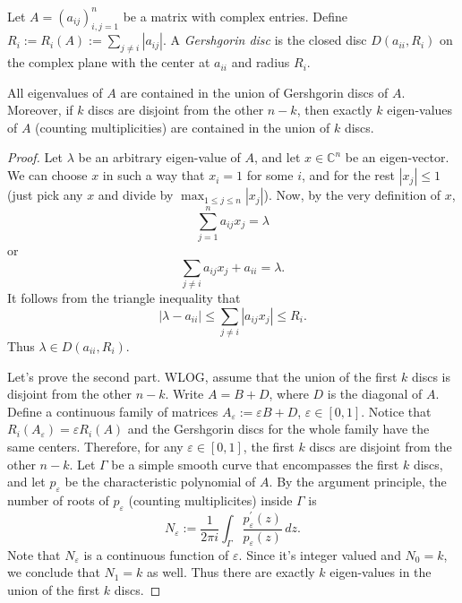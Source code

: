 Let $A = (a_{ij})_{i,j=1}^n$ be a matrix with complex entries. Define $R_i:=R_i(A) := \sum_{j\neq i} |a_{ij}|$. A \emph{Gershgorin disc} is the closed disc $D(a_{ii},R_i)$ on the complex plane with the center at $a_{ii}$ and radius $R_i$.
\begin{theorem}
All eigenvalues of $A$ are contained in the union of Gershgorin discs of $A$. Moreover, if $k$ discs are disjoint from the other $n-k$, then exactly $k$ eigen-values of $A$ (counting multiplicities) are contained in the union of $k$ discs.
\end{theorem}
\begin{proof}
Let $\lambda$ be an arbitrary eigen-value of $A$, and let $x\in \mathbb C^n$ be an eigen-vector. We can choose $x$ in such a way that $x_i = 1$ for some $i$, and for the rest $|x_j| \leq 1$ (just pick any $x$ and divide by $\max_{1\leq j\leq n}|x_j|$). Now, by the very definition of $x$,
\[
\sum_{j=1}^n a_{ij}x_j = \lambda
\]
or
\[
\sum_{j \neq i} a_{ij}x_j + a_{ii} = \lambda.
\]
It follows from the triangle inequality that
\[
|\lambda-a_{ii}| \leq \sum_{j \neq i} |a_{ij}x_j| \leq R_{i}.
\]
Thus $\lambda \in D(a_{ii}, R_i)$.

Let's prove the second part. WLOG, assume that the union of the first $k$ discs is disjoint from the other $n-k$. Write $A = B + D$, where $D$ is the diagonal of $A$. Define a continuous family of matrices $A_{\varepsilon}:= \varepsilon B + D$, $\varepsilon \in [0,1]$. Notice that $R_i(A_{\varepsilon}) = \varepsilon R_i(A)$ and the Gershgorin discs for the whole family have the same centers. Therefore, for any $\varepsilon \in [0,1]$, the first $k$ discs are disjoint from the other $n-k$. Let $\Gamma$ be a simple smooth curve that encompasses the first $k$ discs, and let $p_{\varepsilon}$ be the characteristic polynomial of $A$. By the argument principle, the number of roots of $p_{\varepsilon}$ (counting multiplicites) inside $\Gamma$ is 
\[
N_{\varepsilon} := \frac{1}{2\pi i}\int_{\Gamma} \frac{p^\prime_{\varepsilon}(z)}{p_{\varepsilon}(z)}\, dz.
\]
Note that $N_{\varepsilon}$ is a continuous function of $\varepsilon$. Since it's integer valued and $N_0 = k$, we conclude that $N_1 = k$ as well. Thus there are exactly $k$ eigen-values in the union of the first $k$ discs.
\end{proof}